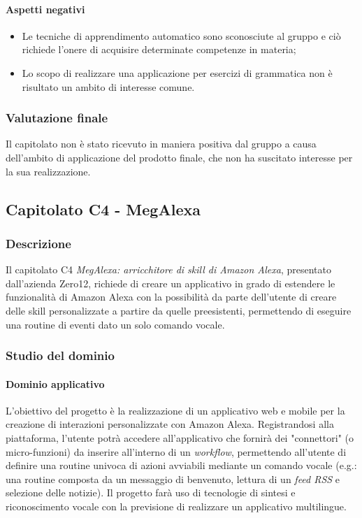 {	\paragraph{Aspetti negativi} 
	\begin{itemize}
		\item {Le tecniche di apprendimento automatico sono sconosciute al gruppo e ciò richiede l'onere di acquisire determinate competenze in materia;}
		\item {Lo scopo di realizzare una applicazione per esercizi di grammatica non è risultato un ambito di interesse comune.}
	\end{itemize} 
	\subsubsection{Valutazione finale}
	Il capitolato non è stato ricevuto in maniera positiva dal gruppo a causa dell'ambito di applicazione del prodotto finale, che non ha suscitato interesse per la sua realizzazione.
	
\subsection{Capitolato C4 - MegAlexa}
\subsubsection{Descrizione}    
Il capitolato C4 \emph{MegAlexa: arricchitore di skill di Amazon Alexa}, presentato dall'azienda Zero12, richiede di creare un applicativo in grado di estendere le funzionalità di Amazon Alexa con la possibilità da parte dell'utente di creare delle skill personalizzate a partire da quelle preesistenti, permettendo di eseguire una routine di eventi dato un solo comando vocale.
\subsubsection{Studio del dominio}

\paragraph{Dominio applicativo} \Spazio
L'obiettivo del progetto è la realizzazione di un applicativo web e mobile per la creazione di interazioni personalizzate con Amazon Alexa. Registrandosi alla piattaforma, l'utente potrà accedere all'applicativo che fornirà dei "connettori" (o micro-funzioni) da inserire all'interno di un \emph{workflow}, permettendo all'utente di definire una routine univoca di azioni avviabili mediante un comando vocale (e.g.: una routine composta da un messaggio di benvenuto, lettura di un \emph{feed RSS} e selezione delle notizie). Il progetto farà uso di tecnologie di sintesi e riconoscimento vocale con la previsione di realizzare un applicativo multilingue.
}
